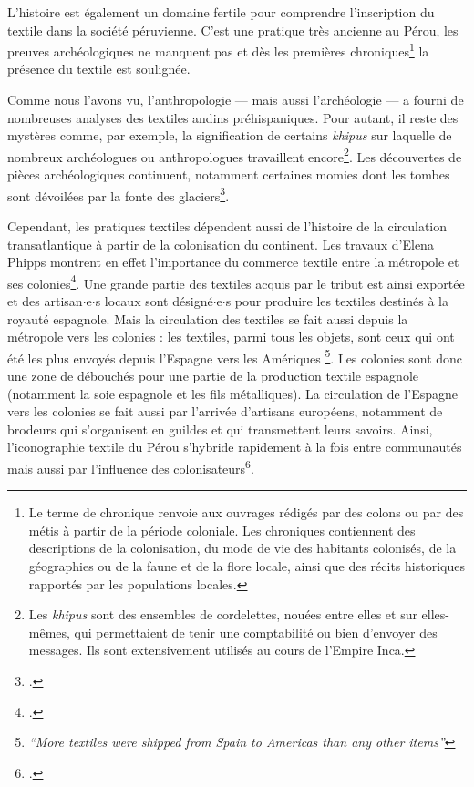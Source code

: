 \documentclass[a4paper, twoside, 12pt]{book}
\newcommand{\inclusives}[1]{$\cdot${#1}$\cdot${s}}
\begin{document}
L'histoire est également un domaine fertile pour comprendre l'inscription du textile dans la société péruvienne. C'est une pratique très ancienne au Pérou, les preuves archéologiques ne manquent pas et dès les premières chroniques\footnote{Le terme de chronique renvoie aux ouvrages rédigés par des colons ou par des métis à partir de la période coloniale. Les chroniques contiennent des descriptions de la colonisation, du mode de vie des habitants colonisés, de la géographies ou de la faune et de la flore locale, ainsi que des récits historiques rapportés par les populations locales.} la présence du textile est soulignée.

Comme nous l'avons vu, l'anthropologie --- mais aussi l'archéologie --- a fourni de nombreuses analyses des textiles andins préhispaniques. Pour autant, il reste des mystères comme, par exemple, la signification de certains \textit{khipus} sur laquelle de nombreux archéologues ou anthropologues travaillent encore\footnote{Les \textit{khipus} sont des ensembles de cordelettes, nouées entre elles et sur elles-mêmes, qui permettaient de tenir une comptabilité ou bien d'envoyer des messages. Ils sont extensivement utilisés au cours de l'Empire Inca.}. Les découvertes de pièces archéologiques continuent, notamment certaines momies dont les tombes sont dévoilées par la fonte des glaciers\footcite{abalderussoArteTextilIncaico2010}. 

Cependant, les pratiques textiles dépendent aussi de l'histoire de la circulation transatlantique à partir de la colonisation du continent. Les travaux d'Elena Phipps montrent en effet l'importance du commerce textile entre la métropole et ses colonies\footcite{phippsIberianGlobe2013}. Une grande partie des textiles acquis par le tribut est ainsi exportée et des artisan\inclusives{e} locaux sont désigné\inclusives{e} pour produire les textiles destinés à la royauté espagnole. Mais la circulation des textiles se fait aussi depuis la métropole vers les colonies : \og les textiles, parmi tous les objets, sont ceux qui ont été les plus envoyés depuis l'Espagne vers les Amériques \fg \footnote{\cite[p.~33]{phippsIberianGlobe2013} \textit{\textquotedblleft More textiles were shipped from Spain to Americas than any other items''}}. Les colonies sont donc une zone de débouchés pour une partie de la production textile espagnole (notamment la soie espagnole et les fils métalliques). La circulation de l'Espagne vers les colonies se fait aussi par l'arrivée d'artisans européens, notamment de brodeurs qui s'organisent en guildes et qui transmettent leurs savoirs. Ainsi, l'iconographie textile du Pérou s'hybride rapidement à la fois entre communautés mais aussi par l'influence des colonisateurs\footcite{solorzanogonzalesTapizAndinoNobleza2020}.
\end{document}
